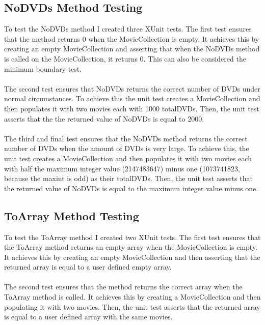 \documentclass[12pt,a4paper]{article}
\begin{document}
		\subsection{NoDVDs Method Testing}
			To test the NoDVDs method I created three XUnit tests. The first test 
			ensures that the method returns 0 when the MovieCollection is empty. 
			It achieves this by creating an empty MovieCollection and asserting that 
			when the NoDVDs method is called on the MovieCollection, it returns 0. 
			This can also be considered the minimum boundary test.\\ 
			\\
			The second test ensures that NoDVDs returns the correct number of DVDs under 
			normal circumstances. To achieve this the unit test creates a MovieCollection 
			and then populates it with two movies each with 1000 totalDVDs. Then, the 
			unit test asserts that the the returned value of NoDVDs is equal to 2000.\\
			\\
			The third and final test ensures that the NoDVDs method returns the correct 
			number of DVDs when the amount of DVDs is very large. To achieve this, the 
			unit test creates a MovieCollection and then populates it with two movies 
			each with half the maximum integer value (2147483647) minus one (1073741823, 
			because the maxint is odd) as their totalDVDs. Then, the unit test asserts 
			that the returned value of NoDVDs is equal to the maximum integer value 
			minus one.\\

		\subsection{ToArray Method Testing}
			To test the ToArray method I created two XUnit tests. The first test ensures 
			that the ToArray method returns an empty array when the MovieCollection is empty. 
			It achieves this by creating an empty MovieCollection and then asserting that the 
			returned array is equal to a user defined empty array.\\
			\\
			The second test ensures that the method returns the correct array when the 
			ToArray method is called. It achieves this by creating a MovieCollection 
			and then populating it with two movies. Then, the unit test asserts that 
			the returned array is equal to a user defined array with the same movies.\\
\end{document}
